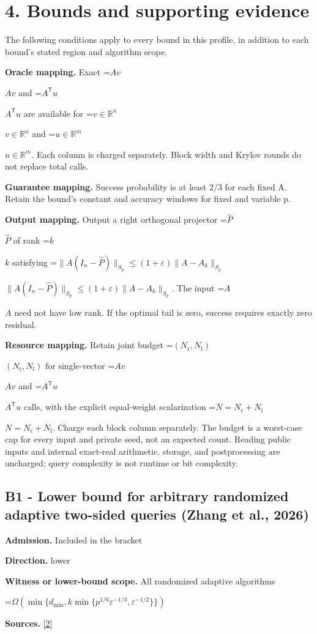 \documentclass[10pt,a4paper]{article}
\newcommand{\AtlasMath}[1]{\par\begingroup\centering\setbox0=\hbox{$\displaystyle #1$}\ifdim\wd0>1.4\linewidth\typeout{ATLAS WIDE FORMULA: \the\wd0}\fi\ifdim\wd0>\linewidth\resizebox{\linewidth}{!}{\box0}\else\box0\fi\par\endgroup}
\newcommand{\AtlasInlineMath}[1]{\begingroup\setbox0=\hbox{$#1$}\ifdim\wd0>.4\linewidth\endgroup\AtlasMath{#1}\else\endgroup$#1$\fi}
\begin{document}
\section{4. Bounds and supporting evidence}
The following conditions apply to every bound in this profile, in addition to each bound's stated region and algorithm scope.

\textbf{Oracle mapping.} Exact \AtlasInlineMath{Av} and \AtlasInlineMath{A^{\mathsf T}u} are available for \AtlasInlineMath{v\in\mathbb R^n} and \AtlasInlineMath{u\in\mathbb R^m}. Each column is charged separately. Block width and Krylov rounds do not replace total calls.

\textbf{Guarantee mapping.} Success probability is at least 2/3 for each fixed A. Retain the bound’s constant and accuracy windows for fixed and variable p.

\textbf{Output mapping.} Output a right orthogonal projector \AtlasInlineMath{\widehat P} of rank \AtlasInlineMath{k} satisfying \AtlasInlineMath{\|A(I_n-\widehat P)\|_{S_p}\le(1+\varepsilon)\|A-A_k\|_{S_p}}. The input \AtlasInlineMath{A} need not have low rank. If the optimal tail is zero, success requires exactly zero residual.

\textbf{Resource mapping.} Retain joint budget \AtlasInlineMath{(N_{\mathrm r},N_{\mathrm l})} for single-vector \AtlasInlineMath{Av} and \AtlasInlineMath{A^{\mathsf T}u} calls, with the explicit equal-weight scalarization \AtlasInlineMath{N=N_{\mathrm r}+N_{\mathrm l}}. Charge each block column separately. The budget is a worst-case cap for every input and private seed, not an expected count. Reading public inputs and internal exact-real arithmetic, storage, and postprocessing are uncharged; query complexity is not runtime or bit complexity.

\subsection{B1 - Lower bound for arbitrary randomized adaptive two-sided queries (Zhang et al., 2026)}
\textbf{Admission.} Included in the bracket

\textbf{Direction.} lower

\textbf{Witness or lower-bound scope.} All randomized adaptive algorithms

\AtlasMath{\Omega(\min\{d_{\mathrm{min}},k\min\{p^{1/6}\varepsilon^{-1/3},\varepsilon^{-1/2}\}\})}
\textbf{Sources.} \href{https://arxiv.org/pdf/2609.35840v2}{[2]}
\end{document}
